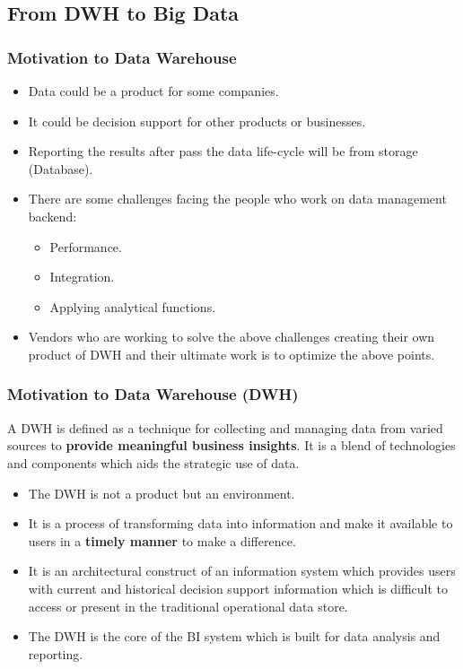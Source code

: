 

\subsection{From DWH to Big Data}
\begin{frame}
\frametitle{Motivation to Data Warehouse}
\begin{itemize}[<+->]
	\item Data could be a product for some companies.
	\item It could be decision support for other products or businesses.
	\item Reporting the results after pass the data life-cycle will be from storage (Database).
	\item There are some challenges facing the people who work on data management backend:
	\begin{itemize}
		\item Performance.
		\item Integration.
		\item Applying analytical functions. %
	\end{itemize}
	\item Vendors who are working to solve the above challenges creating their own product of DWH and their ultimate work is to optimize the above points.
\end{itemize}
\end{frame}

\begin{frame}
\frametitle{Motivation to Data Warehouse (DWH)}

\begin{definition} A DWH is defined as a technique for collecting and managing data from varied sources to \textbf{provide meaningful business insights}. It is a blend of technologies and components which aids the strategic use of data.\footnotemark
\end{definition}
\begin{itemize}
	\item The DWH is not a product but an environment.
	\item It is a process of transforming data into information and make it available to users in a \textbf{timely manner} to make a difference.
	\item It is an architectural construct of an information system which provides users with current and historical decision support information which is difficult to access or present in the traditional operational data store.
	\item The DWH is the core of the BI system which is built for data analysis and reporting.
\end{itemize}
\end{frame}

